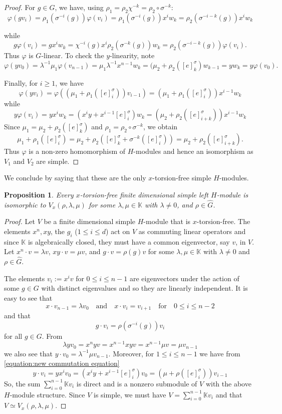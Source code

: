 \documentclass[11pt, twoside]{amsart}
\newtheorem{proposition}[theorem]{Proposition}
\theoremstyle{definition}
\newcommand{\KK}{\mathbb{K}}
\newcommand{\wind}[2]{[#1]_{#2}^{\sigma}}
\begin{document}
\begin{proof}
For  $g \in G$, we have, using $\rho_1 = \rho_2 \chi^{-k} = \rho_2\circ \sigma^{-k}$:
%
\[\varphi(g v_{i}) = \rho_1 (\sigma^{-i}(g)) \varphi(v_{i}) = \rho_1 (\sigma^{-i}(g)) x^iw_k = \rho_2 (\sigma^{-i-k}(g)) x^iw_k\]

%
while
%
\[g \varphi(v_{i}) = g x^i w_k = \chi^{-i}(g) x^i \rho_2(\sigma^{-k}(g)) w_k  =\rho_2(\sigma^{-i-k}(g)) \varphi(v_i).\]
%
Thus $\varphi$ is $G$-linear. To check the $y$-linearity, note
%
\[
\varphi(yv_0)=\lambda^{-1}\mu_1\varphi(v_{n-1})
=\mu_1\lambda^{-1}x^{n-1}w_k 
=(\mu_2 + \rho_2(\wind{e}{k})w_{k-1} = y w_k = y\varphi(v_0).
\]
%


Finally, for $i \geq 1$, we have
%
\[\varphi(y v_{i}) = \varphi((\mu_1 + \rho_1 (\wind{e}{i}))v_{i-1}) = (\mu_1 + \rho_1 (\wind{e}{i})) x^{i-1}w_{k}\]
%
while
%
\[y \varphi(v_{i}) = yx^i w_k = (x^iy + x^{i-1}\wind{e}{i})w_k = (\mu_2 + \rho_2 (\wind{e}{i+k})) x^{i-1} w_{k}\]
%
Since $\mu_1 = \mu_2 + \rho_2(\wind{e}{k})$ and $\rho_1=\rho_2\circ \sigma^{-k}$, we obtain
\[ \mu_1 + \rho_1 (\wind{e}{i}) = \mu_2 + \rho_2(\wind{e}{k} + \sigma^{-k} (\wind{e}{i})) = \mu_2 + \rho_2 (\wind{e}{i+k}).\]
Thus $\varphi$ is a non-zero homomorphism of $H$-modules and hence an isomorphism as $V_1$ and $V_2$ are simple.
\end{proof}
%
We conclude by saying that these are the only $x$-torsion-free simple $H$-modules.
%
\begin{proposition}
    Every $x$-torsion-free finite dimensional simple left $H$-module is isomorphic to $V_x (\rho, \lambda, \mu)$ for some $\lambda, \mu \in \KK$ with $\lambda \neq 0$, and  $\rho\in \widehat{G}$.
\end{proposition}
\begin{proof}
    Let $V$ be a finite dimensional simple $H$-module that is $x$-torsion-free. The elements $x^n, xy$, the $g_i$ ($1 \leq i \leq d$) act on $V$ as commuting linear operators and since $\KK$ is algebraically closed, they must have a common eigenvector, say $v$, in $V$. Let $x^n \cdot v = \lambda v$, $xy\cdot v = \mu v$, and $g \cdot v = \rho(g)v$ for some $\lambda, \mu \in \KK$ with $\lambda \neq 0$ and $\rho\in \widehat{G}$.

    The elements $v_i := x^i v$ for $0 \leq i \leq n-1$ are eigenvectors under the action of some $g \in G$ with distinct eigenvalues and so they are linearly independent. It is easy to see that 
    \[x\cdot v_{n-1} = \lambda v_0\quad \text{and}\quad x \cdot v_i = v_{i+1}\quad \text{for}\quad 0 \leq i \leq n-2\]
    and that
    \[g\cdot v_i = \rho(\sigma^{-i}(g))v_i\]
    for all $g \in G$.
    From
    \[\lambda y v_0 = x^n y v = x^{n-1}xyv = x^{n-1}\mu v = \mu v_{n-1}\]
    we also see that $y\cdot v_0 = \lambda^{-1}\mu v_{n-1}$. Moreover, for $1 \leq i \leq n-1$ we have from \eqref{equation:new commutation equation}
    \[ y\cdot v_i = yx^i v_0 = (x^i y + x^{i-1}\wind{e}{i})v_0 = (\mu + \rho(\wind{e}{i}))v_{i-1}\]
    So, the sum $\sum_{i=0}^{n-1}\KK v_i$ is direct and is a nonzero submodule of $V$ with the above $H$-module structure. Since $V$ is simple, we must have $V = \sum_{i=0}^{n-1}\KK v_i$ and that $V \simeq V_x (\rho, \lambda, \mu)$.
\end{proof}
\end{document}
